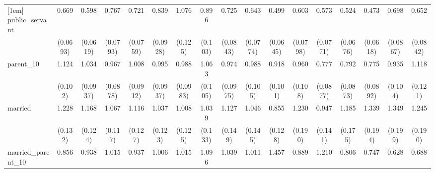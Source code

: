 {\begin{tabular}{l*{16}{c}}
[1em]
public\_servant      &       0.669\sym{***}&       0.598\sym{***}&       0.767\sym{*}  &       0.721\sym{**} &       0.839         &       1.076         &       0.896         &       0.725\sym{**} &       0.643\sym{***}&       0.499\sym{***}&       0.603\sym{***}&       0.573\sym{***}&       0.524\sym{***}&       0.473\sym{***}&       0.698\sym{**} &       0.652\sym{***}\\
                    &    (0.0693)         &    (0.0619)         &    (0.0793)         &    (0.0759)         &    (0.0928)         &     (0.125)         &     (0.103)         &    (0.0843)         &    (0.0774)         &    (0.0645)         &    (0.0798)         &    (0.0771)         &    (0.0676)         &    (0.0618)         &    (0.0867)         &    (0.0842)         \\
[1em]
parent\_10           &       1.124         &       1.034         &       0.967         &       1.008         &       0.995         &       0.988         &       1.063         &       0.974         &       0.988         &       0.918         &       0.960         &       0.777\sym{*}  &       0.792\sym{*}  &       0.775\sym{*}  &       0.935         &       1.118         \\
                    &     (0.102)         &    (0.0937)         &    (0.0878)         &    (0.0912)         &    (0.0937)         &    (0.0983)         &     (0.105)         &    (0.0975)         &     (0.105)         &     (0.101)         &     (0.108)         &    (0.0877)         &    (0.0873)         &    (0.0892)         &     (0.104)         &     (0.121)         \\
[1em]
married             &       1.228         &       1.168         &       1.067         &       1.116         &       1.037         &       1.008         &       1.039         &       1.127         &       1.046         &       0.855         &       1.230         &       0.947         &       1.185         &       1.339\sym{*}  &       1.349\sym{*}  &       1.245         \\
                    &     (0.132)         &     (0.124)         &     (0.117)         &     (0.127)         &     (0.123)         &     (0.125)         &     (0.133)         &     (0.149)         &     (0.145)         &     (0.128)         &     (0.190)         &     (0.141)         &     (0.175)         &     (0.194)         &     (0.199)         &     (0.190)         \\
[1em]
married\_parent\_10   &       0.856         &       0.938         &       1.015         &       0.937         &       1.006         &       1.015         &       1.096         &       1.039         &       1.011         &       1.457\sym{*}  &       0.889         &       1.210         &       0.806         &       0.747         &       0.628\sym{*}  &       0.688\sym{*}  \\

\end{tabular}}

